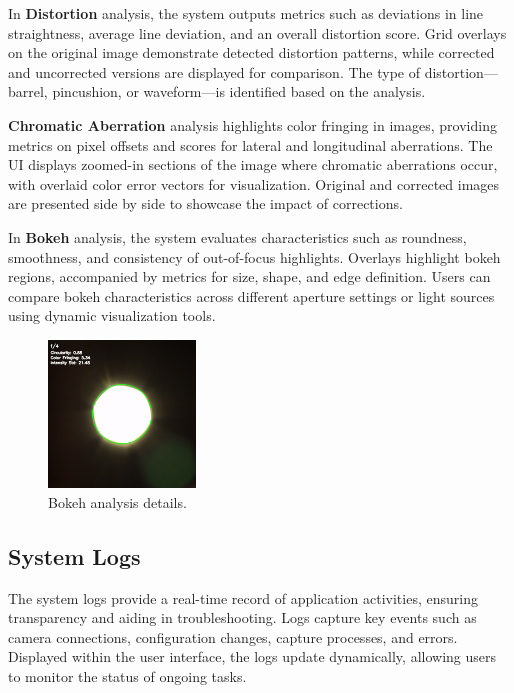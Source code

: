 In \textbf{Distortion} analysis, the system outputs metrics such as deviations in line straightness, average line deviation, and an overall distortion score. Grid overlays on the original image demonstrate detected distortion patterns, while corrected and uncorrected versions are displayed for comparison. The type of distortion—barrel, pincushion, or waveform—is identified based on the analysis.

\textbf{Chromatic Aberration} analysis highlights color fringing in images, providing metrics on pixel offsets and scores for lateral and longitudinal aberrations. The UI displays zoomed-in sections of the image where chromatic aberrations occur, with overlaid color error vectors for visualization. Original and corrected images are presented side by side to showcase the impact of corrections.

In \textbf{Bokeh} analysis, the system evaluates characteristics such as roundness, smoothness, and consistency of out-of-focus highlights. Overlays highlight bokeh regions, accompanied by metrics for size, shape, and edge definition. Users can compare bokeh characteristics across different aperture settings or light sources using dynamic visualization tools.

\begin{figure}[h]
\centering
\includegraphics[width=0.35\textwidth]{Images/bokeh_image_result.jpg}
\caption{Bokeh analysis details.}
\label{fig:ui_bokeh_image}
\end{figure}

\subsection{System Logs}

The system logs provide a real-time record of application activities, ensuring transparency and aiding in troubleshooting. Logs capture key events such as camera connections, configuration changes, capture processes, and errors. Displayed within the user interface, the logs update dynamically, allowing users to monitor the status of ongoing tasks.


